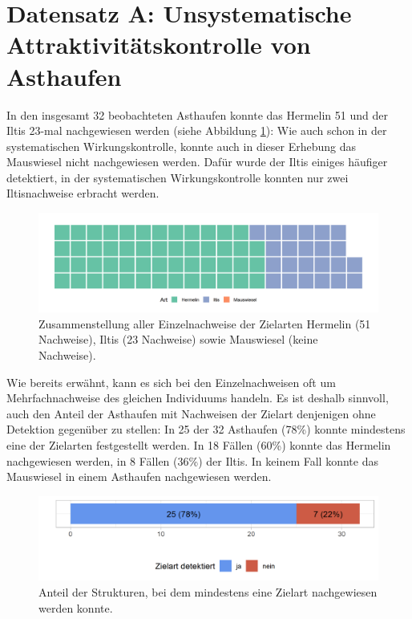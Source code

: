 \documentclass[
  oneside]{scrbook}
\begin{document}
\hypertarget{datensatz-a-unsystematische-attraktivituxe4tskontrolle-von-asthaufen-1}{%
\section{Datensatz A: Unsystematische Attraktivitätskontrolle von Asthaufen}\label{datensatz-a-unsystematische-attraktivituxe4tskontrolle-von-asthaufen-1}}

In den insgesamt 32 beobachteten Asthaufen konnte das Hermelin 51 und der Iltis 23-mal nachgewiesen werden (siehe Abbildung \ref{fig:wirkungskontrollespontaneinzelnachweisewaffle}): Wie auch schon in der systematischen Wirkungskontrolle, konnte auch in dieser Erhebung das Mauswiesel nicht nachgewiesen werden. Dafür wurde der Iltis einiges häufiger detektiert, in der systematischen Wirkungskontrolle konnten nur zwei Iltisnachweise erbracht werden.



\begin{figure}
\includegraphics[width=1\linewidth]{images/wirkungskontrolle_spontan_einzelnachweise_waffle} \caption{Zusammenstellung aller Einzelnachweise der Zielarten Hermelin (51 Nachweise), Iltis (23 Nachweise) sowie Mauswiesel (keine Nachweise).}\label{fig:wirkungskontrollespontaneinzelnachweisewaffle}
\end{figure}

Wie bereits erwähnt, kann es sich bei den Einzelnachweisen oft um Mehrfachnachweise des gleichen Individuums handeln. Es ist deshalb sinnvoll, auch den Anteil der Asthaufen mit Nachweisen der Zielart denjenigen ohne Detektion gegenüber zu stellen: In 25 der 32 Asthaufen (78\%) konnte mindestens eine der Zielarten festgestellt werden. In 18 Fällen (60\%) konnte das Hermelin nachgewiesen werden, in 8 Fällen (36\%) der Iltis. In keinem Fall konnte das Mauswiesel in einem Asthaufen nachgewiesen werden.



\begin{figure}
\includegraphics[width=1\linewidth]{images/wirkungskontrolle_spontan_strukturen_mit_zielart} \caption{Anteil der Strukturen, bei dem mindestens eine Zielart nachgewiesen werden konnte.}\label{fig:wirkungskontrollespontanstrukturenmitzielart}
\end{figure}
\end{document}

